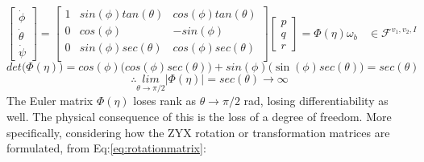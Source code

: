 \begin{equation}\label{eq:euler-derivative}
\begin{bmatrix}
\dot{\phi}\\
\dot{\theta}\\
\dot{\psi}
\end{bmatrix}
=\begin{bmatrix}
1 & sin(\phi)tan(\theta) & cos(\phi)tan(\theta)\\
0 & cos(\phi) & -sin(\phi)\\
0 & sin(\phi)sec(\theta) & cos(\phi)sec(\theta)\\
\end{bmatrix}
\begin{bmatrix}
p\\
q\\
r
\end{bmatrix}
=\Phi(\eta)\omega_b~~~~\in\mathcal{F}^{v_1,v_2,I}
\end{equation}
\vspace{-2pt}
\begin{equation}
det\big(\Phi(\eta)\big)=cos(\phi)\big(cos(\phi)sec(\theta)\big)+sin(\phi)\big(\sin(\phi)sec(\theta)\big)=sec(\theta)
\end{equation}
\vspace{-6pt}
\begin{equation}
\therefore \underset{{\theta \rightarrow \pi /2}}{lim}|\Phi(\eta)|=sec(\theta)\rightarrow \infty
\end{equation}
The Euler matrix $\Phi(\eta)$ loses rank as $\theta\rightarrow\pi/2$ rad, losing differentiability as well. The physical consequence of this is the loss of a degree of freedom. More specifically, considering how the ZYX rotation or transformation matrices are formulated, from Eq:\ref{eq:rotationmatrix}:
